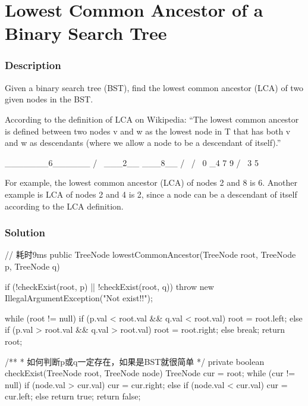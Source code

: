 \newpage

\section{Lowest Common Ancestor of a Binary Search Tree} %

\subsubsection{Description}

Given a binary search tree (BST), find the lowest common ancestor (LCA) of two given nodes in the BST.

According to the definition of LCA on Wikipedia: “The lowest common ancestor is defined between two nodes v and w as the lowest node in T that has both v and w as descendants (where we allow a node to be a descendant of itself).”
\begin{Code}
        _______6______
       /              \
    ___2__          ___8__
   /      \        /      \
   0      _4       7       9
         /  \
         3   5
\end{Code}
For example, the lowest common ancestor (LCA) of nodes 2 and 8 is 6. Another example is LCA of nodes 2 and 4 is 2, since a node can be a descendant of itself according to the LCA definition.

\subsubsection{Solution}

\begin{Code}
// 耗时9ms
public TreeNode lowestCommonAncestor(TreeNode root, TreeNode p, TreeNode q) {
    if (!checkExist(root, p) || !checkExist(root, q)) {
        throw new IllegalArgumentException("Not exist!!");
    }

    while (root != null) {
        if (p.val < root.val && q.val < root.val) {
            root = root.left;
        } else if (p.val > root.val && q.val > root.val) {
            root = root.right;
        } else {
            break;
        }
    }
    return root;
}

/**
 * 如何判断p或q一定存在，如果是BST就很简单
 */
private boolean checkExist(TreeNode root, TreeNode node) {
    TreeNode cur = root;
    while (cur != null) {
        if (node.val > cur.val) {
            cur = cur.right;
        } else if (node.val < cur.val) {
            cur = cur.left;
        } else {
            return true;
        }
    }
    return false;
}
\end{Code}

